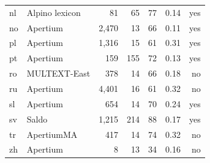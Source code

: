 \documentclass[11pt,letterpaper]{article}
\begin{document}
\begin{table}[t]
\begin{tabular}{llrrr|rr}
nl &  Alpino lexicon  & 81 & 65 & 77 & 0.14&yes\\
no & Apertium & 2,470 & 13 & 66 & 0.11 & yes\\
pl & Apertium & 1,316 &  15 & 61 & 0.31 & yes\\
pt & Apertium & 159 & 155 & 72 & 0.13 & yes\\
ro &  MULTEXT-East  & 378 & 14 & 66 & 0.18 & no \\
ru & Apertium & 4,401 &16& 61 & 0.32 & no  \\
sl & Apertium & 654 & 14 & 70 & 0.24 &yes\\
sv & Saldo & 1,215 & 214 & 88 & 0.17 & yes\\
tr & ApertiumMA & 417 & 14 & 74 & 0.32  &no \\
zh & Apertium & 8 & 13 & 34 & 0.16 & no \\

\end{tabular}
\end{table}
\end{document}
